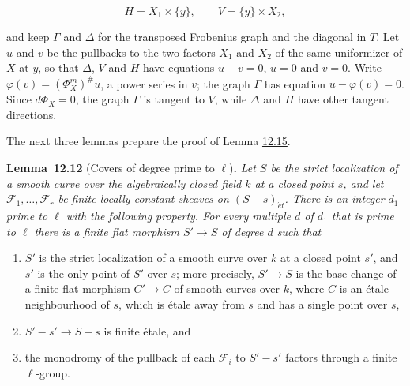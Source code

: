 \documentclass[11pt]{article}
\newenvironment{bpstatement}[2]{\par\addvspace{0.6\baselineskip}\noindent\textbf{#1}#2\textbf{.}\enspace\ignorespaces}
  {\par\addvspace{0.4\baselineskip}}
\newenvironment{bpstatementit}[2]{\begin{bpstatement}{#1}{#2}\itshape\ignorespaces}{\end{bpstatement}}
\begin{document}
\[
H=X_1\times\{y\},\qquad V=\{y\}\times X_2,
\]

and keep \(\Gamma\) and \(\Delta\) for the transposed Frobenius graph and the diagonal in \(T\). Let \(u\) and \(v\) be the pullbacks to the two factors \(X_1\) and \(X_2\) of the same uniformizer of \(X\) at \(y\), so that \(\Delta\), \(V\) and \(H\) have equations \(u-v=0\), \(u=0\) and \(v=0\). Write \(\varphi(v)=(\Phi_X^m)^\#u\), a power series in \(v\); the graph \(\Gamma\) has equation \(u-\varphi(v)=0\). Since \(d\Phi_X=0\), the graph \(\Gamma\) is tangent to \(V\), while \(\Delta\) and \(H\) have other tangent directions.

The next three lemmas prepare the proof of Lemma \hyperref[bp270]{12.15}.

\label{bp263}%
\begin{bpstatementit}{Lemma~12.12}{ (Covers of degree prime to $\ell$)}
Let \(S\) be the strict localization of a smooth curve over the algebraically closed field \(k\) at a closed point \(s\), and let \(\mathcal F_1,\dots,\mathcal F_r\) be finite locally constant sheaves on \((S-s)_{\acute{e}t}\). There is an integer \(d_1\) prime to \(\ell\) with the following property. For every multiple \(d\) of \(d_1\) that is prime to \(\ell\) there is a finite flat morphism \(S'\to S\) of degree \(d\) such that

\begin{enumerate}
\item \(S'\) is the strict localization of a smooth curve over \(k\) at a closed point \(s'\), and \(s'\) is the only point of \(S'\) over \(s\); more precisely, \(S'\to S\) is the base change of a finite flat morphism \(C'\to C\) of smooth curves over \(k\), where \(C\) is an étale neighbourhood of \(s\), which is étale away from \(s\) and has a single point over \(s\),
\item \(S'-s'\to S-s\) is finite étale, and
\item the monodromy of the pullback of each \(\mathcal F_i\) to \(S'-s'\) factors through a finite \(\ell\)-group.
\end{enumerate}
\end{bpstatementit}
\end{document}
